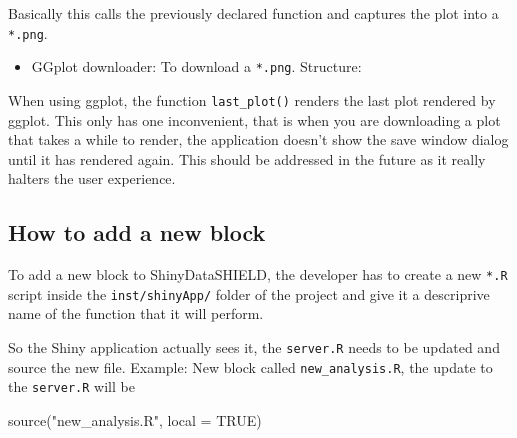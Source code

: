 \documentclass[
]{book}
\newenvironment{Shaded}{\begin{snugshade}}{\end{snugshade}}
\newcommand{\AttributeTok}[1]{\textcolor[rgb]{0.77,0.63,0.00}{#1}}
\newcommand{\ConstantTok}[1]{\textcolor[rgb]{0.00,0.00,0.00}{#1}}
\newcommand{\ControlFlowTok}[1]{\textcolor[rgb]{0.13,0.29,0.53}{\textbf{#1}}}
\newcommand{\FunctionTok}[1]{\textcolor[rgb]{0.00,0.00,0.00}{#1}}
\newcommand{\NormalTok}[1]{#1}
\newcommand{\OtherTok}[1]{\textcolor[rgb]{0.56,0.35,0.01}{#1}}
\newcommand{\SpecialCharTok}[1]{\textcolor[rgb]{0.00,0.00,0.00}{#1}}
\newcommand{\StringTok}[1]{\textcolor[rgb]{0.31,0.60,0.02}{#1}}
\providecommand{\tightlist}{%
  \setlength{\itemsep}{0pt}\setlength{\parskip}{0pt}}
\begin{document}
Basically this calls the previously declared function and captures the plot into a \texttt{*.png}.

\begin{itemize}
\tightlist
\item
  GGplot downloader: To download a \texttt{*.png}. Structure:
\end{itemize}

\begin{Shaded}
\end{Shaded}

When using ggplot, the function \texttt{last\_plot()} renders the last plot rendered by ggplot. This only has one inconvenient, that is when you are downloading a plot that takes a while to render, the application doesn't show the save window dialog until it has rendered again. This should be addressed in the future as it really halters the user experience.

\hypertarget{how-to-add-a-new-block}{%
\subsection{How to add a new block}\label{how-to-add-a-new-block}}

To add a new block to ShinyDataSHIELD, the developer has to create a new \texttt{*.R} script inside the \texttt{inst/shinyApp/} folder of the project and give it a descriprive name of the function that it will perform.

So the Shiny application actually sees it, the \texttt{server.R} needs to be updated and source the new file. Example: New block called \texttt{new\_analysis.R}, the update to the \texttt{server.R} will be

\begin{Shaded}
\begin{Highlighting}[]
\FunctionTok{source}\NormalTok{(}\StringTok{"new\_analysis.R"}\NormalTok{, }\AttributeTok{local =} \ConstantTok{TRUE}\NormalTok{)}
\end{Highlighting}
\end{Shaded}
\end{document}
